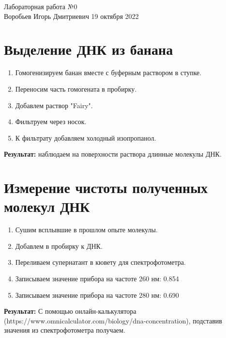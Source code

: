 \documentclass[12pt, letterpaper, twoside]{article}
\begin{document}
\begin{center}
	\LARGE{Лабораторная работа №0}\\[0.2cm]
	\large{Воробьев Игорь Дмитриевич}
	\large{19 октября 2022}
\end{center}

\section{Выделение ДНК из банана}
\begin{enumerate}
	\item Гомогенизируем банан вместе с буферным раствором в ступке.
	\item Переносим часть гомогената в пробирку.
	\item Добавлем раствор "Fairy".
	\item Фильтруем через носок.
	\item К фильтрату добавляем холодный изопропанол.
\end{enumerate}
\textbf{Результат:} наблюдаем на поверхности раствора длинные молекулы ДНК.

\section{Измерение чистоты полученных молекул ДНК}
\begin{enumerate}
	\item Сушим всплывшие в прошлом опыте молекулы.
	\item Добавлем  в пробирку к ДНК.
	\item Переливаем супернатант в кювету для спектрофотометра.
	\item Записываем значение прибора на частоте $260$ нм: 0.854
	
	\item Записываем значение прибора на частоте $280$ нм: 0.690
	
\end{enumerate}
\textbf{Результат:} С помощью онлайн-калькулятора (https://www.omnicalculator.com/biology/dna-concentration), подставив значения из спектрофотометра получаем.
\end{document}

